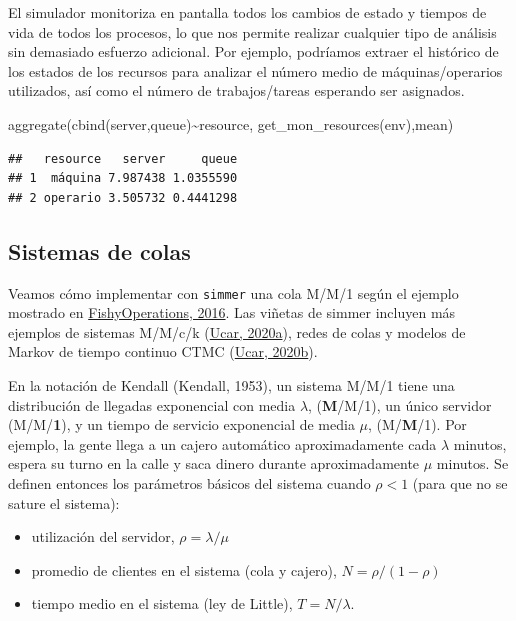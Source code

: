 \documentclass[
]{book}
\newenvironment{Shaded}{\begin{snugshade}}{\end{snugshade}}
\newcommand{\FunctionTok}[1]{\textcolor[rgb]{0.00,0.00,0.00}{#1}}
\newcommand{\NormalTok}[1]{#1}
\newcommand{\SpecialCharTok}[1]{\textcolor[rgb]{0.00,0.00,0.00}{#1}}
\providecommand{\tightlist}{%
  \setlength{\itemsep}{0pt}\setlength{\parskip}{0pt}}
\theoremstyle{definition}
\theoremstyle{definition}
\theoremstyle{definition}
\theoremstyle{definition}
\theoremstyle{remark}
\begin{document}
El simulador monitoriza en pantalla todos los cambios de estado y tiempos de vida de todos los procesos, lo que nos permite realizar cualquier tipo de análisis sin demasiado esfuerzo adicional.
Por ejemplo, podríamos extraer el histórico de los estados de los recursos para analizar el número medio de máquinas/operarios utilizados, así como el número de trabajos/tareas esperando ser asignados.

\begin{Shaded}
\begin{Highlighting}[]
\FunctionTok{aggregate}\NormalTok{(}\FunctionTok{cbind}\NormalTok{(server,queue)}\SpecialCharTok{\textasciitilde{}}\NormalTok{resource, }\FunctionTok{get\_mon\_resources}\NormalTok{(env),mean)}
\end{Highlighting}
\end{Shaded}

\begin{verbatim}
##   resource   server     queue
## 1  máquina 7.987438 1.0355590
## 2 operario 3.505732 0.4441298
\end{verbatim}

\hypertarget{sistemas-de-colas}{%
\subsection{Sistemas de colas}\label{sistemas-de-colas}}

Veamos cómo implementar con \texttt{simmer} una cola M/M/1 según el ejemplo mostrado en \href{https://www.r-bloggers.com/2016/04/simulating-queueing-systems-with-simmer/}{FishyOperations, 2016}. Las viñetas de simmer incluyen más ejemplos de sistemas M/M/c/k (\href{https://r-simmer.org/articles/simmer-06-queueing.html}{Ucar, 2020a}), redes de colas y modelos de Markov de tiempo continuo CTMC (\href{https://r-simmer.org/articles/simmer-07-ctmc.html}{Ucar, 2020b}).

En la notación de Kendall (Kendall, 1953), un sistema M/M/1 tiene una distribución de llegadas exponencial con media \(\lambda\), (\textbf{M}/M/1), un único servidor (M/M/\textbf{1}), y un tiempo de servicio exponencial de media \(\mu\), (M/\textbf{M}/1). Por ejemplo, la gente llega a un cajero automático aproximadamente cada \(\lambda\) minutos, espera su turno en la calle y saca dinero durante aproximadamente \(\mu\) minutos. Se definen entonces los parámetros básicos del sistema cuando \(\rho<1\) (para que no se sature el sistema):

\begin{itemize}
\tightlist
\item
  utilización del servidor, \(\rho=\lambda/\mu\)
\item
  promedio de clientes en el sistema (cola y cajero), \(N=\rho/(1-\rho)\)
\item
  tiempo medio en el sistema (ley de Little), \(T=N/\lambda\).
\end{itemize}
\end{document}
